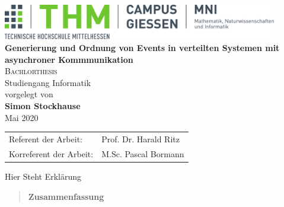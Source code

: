 \documentclass[%
	BCOR=8.25mm,         %
	DIV=12,              %
	parskip=half,				 %
	bibliography=totoc,	 %
	headsepline=on,      %
	openany,
	ngerman
	]{scrbook}
\begin{document}
\frontmatter

\begin{titlepage}
	\begin{center}
	\includegraphics[width=0.9\textwidth]{img/mni-logo}\\[5cm]
	\textbf{\huge\sffamily Generierung und Ordnung von Events in verteilten Systemen mit asynchroner Kommmunikation}\\[2cm]
	\textsc{\Large Bachlorthesis}\\Studiengang Informatik\\[2cm]
	vorgelegt von\\
	\textbf{Simon Stockhause}\\ [1.5cm] 
	Mai 2020
	\end{center}
	\vfill
	\center
	\begin{tabular}{ll}
		Referent der Arbeit: & Prof. Dr. Harald Ritz\\ 
		Korreferent der Arbeit: & M.Sc. Pascal Bormann\\ 
	\end{tabular}
\end{titlepage}
\cleardoubleemptypage

\pagestyle{empty}
{
	\renewcommand{\thispagestyle}[1]{}
 Hier Steht Erklärung
}
\clearpage
\pagestyle{plain}

\pagestyle{empty}
\begin{quote}
	\vspace*{4cm}

	\begin{center}
		\textbf{\Large\sffamily Zusammenfassung}
	\end{center}
\end{quote}
\cleardoubleemptypage


\pagestyle{empty}
{
	\renewcommand{\thispagestyle}[1]{}
	\tableofcontents
}
\clearpage
\pagestyle{plain}
\pagestyle{empty}
{
	\renewcommand{\thispagestyle}[1]{}
	\listoffigures
}
\clearpage
\pagestyle{plain}

\pagestyle{empty}
{
	\renewcommand{\thispagestyle}[1]{}
	\lstlistoflistings
}
\clearpage
\pagestyle{plain}


\mainmatter 
\pagestyle{headings}








\backmatter 

\appendix

\end{document}
